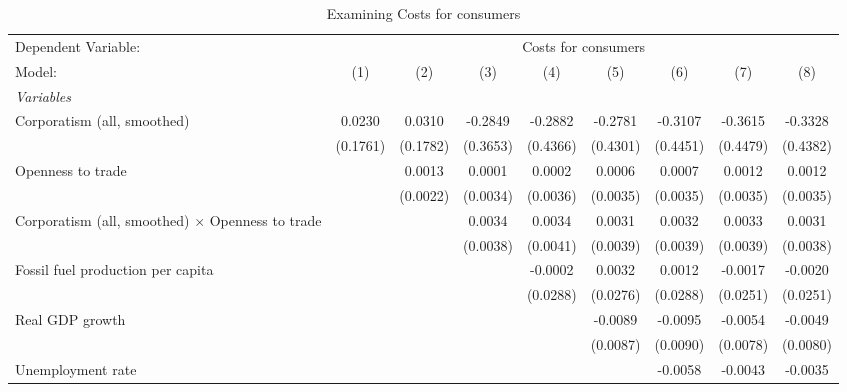 
\begin{table}[htbp]
   \caption{Examining Costs for consumers}
   \centering
   \begin{tabular}{lcccccccc}
      \tabularnewline \midrule \midrule
      Dependent Variable: & \multicolumn{8}{c}{Costs for consumers}\\
      Model:                                                  & (1)      & (2)      & (3)      & (4)      & (5)      & (6)      & (7)      & (8)\\  
      \midrule
      \emph{Variables}\\
      Corporatism (all, smoothed)                             & 0.0230   & 0.0310   & -0.2849  & -0.2882  & -0.2781  & -0.3107  & -0.3615  & -0.3328\\   
                                                              & (0.1761) & (0.1782) & (0.3653) & (0.4366) & (0.4301) & (0.4451) & (0.4479) & (0.4382)\\   
      Openness to trade                                       &          & 0.0013   & 0.0001   & 0.0002   & 0.0006   & 0.0007   & 0.0012   & 0.0012\\   
                                                              &          & (0.0022) & (0.0034) & (0.0036) & (0.0035) & (0.0035) & (0.0035) & (0.0035)\\   
      Corporatism (all, smoothed) $\times$ Openness to trade  &          &          & 0.0034   & 0.0034   & 0.0031   & 0.0032   & 0.0033   & 0.0031\\   
                                                              &          &          & (0.0038) & (0.0041) & (0.0039) & (0.0039) & (0.0039) & (0.0038)\\   
      Fossil fuel production per capita                       &          &          &          & -0.0002  & 0.0032   & 0.0012   & -0.0017  & -0.0020\\   
                                                              &          &          &          & (0.0288) & (0.0276) & (0.0288) & (0.0251) & (0.0251)\\   
      Real GDP growth                                         &          &          &          &          & -0.0089  & -0.0095  & -0.0054  & -0.0049\\   
                                                              &          &          &          &          & (0.0087) & (0.0090) & (0.0078) & (0.0080)\\   
      Unemployment rate                                       &          &          &          &          &          & -0.0058  & -0.0043  & -0.0035\\   

\end{tabular}
\end{table}
